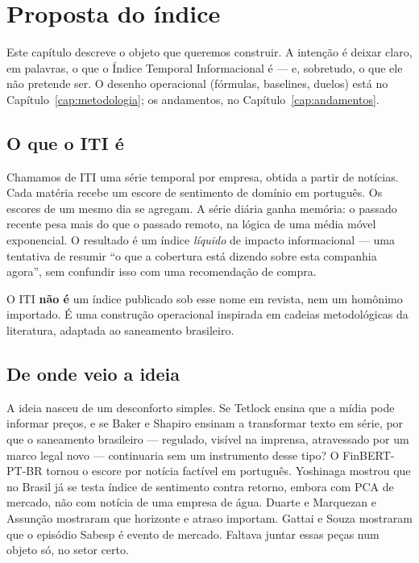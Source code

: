 \chapter{Proposta do índice}
\label{cap:proposta}

Este capítulo descreve o objeto que queremos construir. A intenção é deixar claro, em palavras, o que o Índice Temporal Informacional é --- e, sobretudo, o que ele não pretende ser. O desenho operacional (fórmulas, baselines, duelos) está no Capítulo~\ref{cap:metodologia}; os andamentos, no Capítulo~\ref{cap:andamentos}.

\section{O que o ITI é}

Chamamos de ITI uma série temporal por empresa, obtida a partir de notícias. Cada matéria recebe um escore de sentimento de domínio em português. Os escores de um mesmo dia se agregam. A série diária ganha memória: o passado recente pesa mais do que o passado remoto, na lógica de uma média móvel exponencial. O resultado é um índice \emph{líquido} de impacto informacional --- uma tentativa de resumir ``o que a cobertura está dizendo sobre esta companhia agora'', sem confundir isso com uma recomendação de compra.

O ITI \textbf{não é} um índice publicado sob esse nome em revista, nem um homônimo importado. É uma construção operacional inspirada em cadeias metodológicas da literatura, adaptada ao saneamento brasileiro.

\section{De onde veio a ideia}

A ideia nasceu de um desconforto simples. Se Tetlock ensina que a mídia pode informar preços, e se Baker e Shapiro ensinam a transformar texto em série, por que o saneamento brasileiro --- regulado, visível na imprensa, atravessado por um marco legal novo --- continuaria sem um instrumento desse tipo? O FinBERT-PT-BR \cite{santos2023finbert} tornou o escore por notícia factível em português. Yoshinaga mostrou que no Brasil já se testa índice de sentimento contra retorno, embora com PCA de mercado, não com notícia de uma empresa de água. Duarte e Marquezan e Assunção mostraram que horizonte e atraso importam. Gattai e Souza mostraram que o episódio Sabesp é evento de mercado. Faltava juntar essas peças num objeto só, no setor certo.

